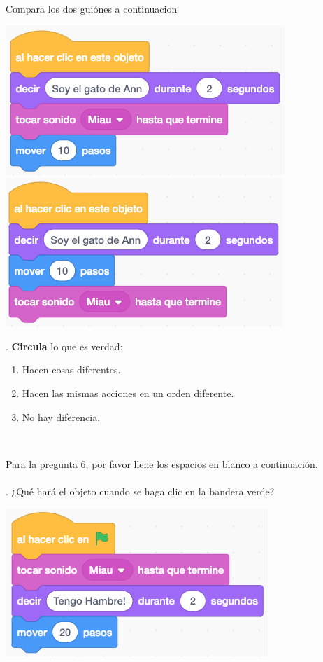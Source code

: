 \documentclass[letterpaper,12pt]{article}
\begin{document}
\noindent Compara los dos guiónes a continuacion
\begin{center}
\includegraphics[scale=.5,valign=t]{q5_script0.png} \hspace{0.5in}
\includegraphics[scale=.5,valign=t]{q5_script1.png}
\end{center}

. \textbf{Circula} lo que es verdad:
\renewcommand{\theenumi}{\Alph{enumi}}
\begin{enumerate}
\item Hacen cosas diferentes. 
\item Hacen las mismas acciones en un orden diferente.
\item No hay diferencia.
\end{enumerate}
\noindent \dotfill \\

\newpage

\noindent Para la pregunta 6, por favor llene los espacios en blanco a continuación. \\ \\
. ¿Qué hará el objeto cuando se haga clic en la bandera verde?
\begin{center}
\includegraphics[scale=.5]{q6_script0.png}
\end{center}
\end{document}
